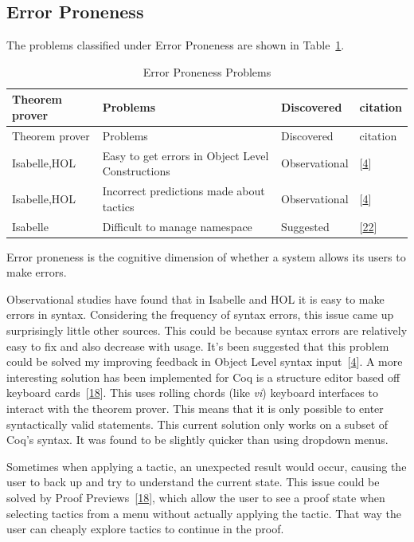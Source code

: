 \documentclass[
]{article}
\begin{document}
\hypertarget{error-proneness}{%
\subsection{Error Proneness}\label{error-proneness}}

The problems classified under Error Proneness are shown in
Table~\ref{tbl:error_proneness}.

\hypertarget{tbl:error_proneness}{}
\begin{longtable}[]{@{}llll@{}}
\caption{\label{tbl:error_proneness}Error Proneness
Problems}\tabularnewline
\toprule
Theorem prover & Problems & Discovered & citation \\
\midrule
\endfirsthead
\toprule
Theorem prover & Problems & Discovered & citation \\
\midrule
\endhead
Isabelle,HOL & Easy to get errors in Object Level Constructions &
Observational & {[}\protect\hyperlink{ref-aitken_analysis_2000}{4}{]} \\
Isabelle,HOL & Incorrect predictions made about tactics & Observational
& {[}\protect\hyperlink{ref-aitken_analysis_2000}{4}{]} \\
Isabelle & Difficult to manage namespace & Suggested &
{[}\protect\hyperlink{ref-bourke_challenges_2012}{22}{]} \\
\bottomrule
\end{longtable}

Error proneness is the cognitive dimension of whether a system allows
its users to make errors.

Observational studies have found that in Isabelle and HOL it is easy to
make errors in syntax. Considering the frequency of syntax errors, this
issue came up surprisingly little other sources. This could be because
syntax errors are relatively easy to fix and also decrease with usage.
It's been suggested that this problem could be solved my improving
feedback in Object Level syntax
input~{[}\protect\hyperlink{ref-aitken_analysis_2000}{4}{]}. A more
interesting solution has been implemented for Coq is a structure editor
based off keyboard
cards~{[}\protect\hyperlink{ref-berman_development_2014}{18}{]}. This
uses rolling chords (like \emph{vi}) keyboard interfaces to interact
with the theorem prover. This means that it is only possible to enter
syntactically valid statements. This current solution only works on a
subset of Coq's syntax. It was found to be slightly quicker than using
dropdown menus.

Sometimes when applying a tactic, an unexpected result would occur,
causing the user to back up and try to understand the current state.
This issue could be solved by Proof
Previews~{[}\protect\hyperlink{ref-berman_development_2014}{18}{]},
which allow the user to see a proof state when selecting tactics from a
menu without actually applying the tactic. That way the user can cheaply
explore tactics to continue in the proof.
\end{document}
